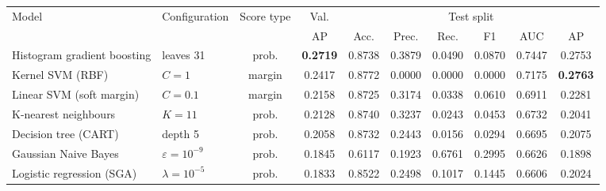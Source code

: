 \begin{tabular}{llcccccccc}
\toprule
\multirow{2}{*}{Model} & \multirow{2}{*}{Configuration} & \multirow{2}{*}{Score type} & Val. & \multicolumn{6}{c}{Test split} \\
\cmidrule(l){5-10}
 & & & AP & Acc. & Prec. & Rec. & F1 & AUC & AP \\
\midrule
Histogram gradient boosting & leaves 31 & prob. & \textbf{0.2719} & 0.8738 & 0.3879 & 0.0490 & 0.0870 & 0.7447 & 0.2753 \\
Kernel SVM (RBF) & $C = 1$ & margin & 0.2417 & 0.8772 & 0.0000 & 0.0000 & 0.0000 & 0.7175 & \textbf{0.2763} \\
Linear SVM (soft margin) & $C = 0.1$ & margin & 0.2158 & 0.8725 & 0.3174 & 0.0338 & 0.0610 & 0.6911 & 0.2281 \\
K-nearest neighbours & $K = 11$ & prob. & 0.2128 & 0.8740 & 0.3237 & 0.0243 & 0.0453 & 0.6732 & 0.2041 \\
Decision tree (CART) & depth 5 & prob. & 0.2058 & 0.8732 & 0.2443 & 0.0156 & 0.0294 & 0.6695 & 0.2075 \\
Gaussian Naive Bayes & $\varepsilon = 10^{-9}$ & prob. & 0.1845 & 0.6117 & 0.1923 & 0.6761 & 0.2995 & 0.6626 & 0.1898 \\
Logistic regression (SGA) & $\lambda = 10^{-5}$ & prob. & 0.1833 & 0.8522 & 0.2498 & 0.1017 & 0.1445 & 0.6606 & 0.2024 \\
\bottomrule
\end{tabular}
